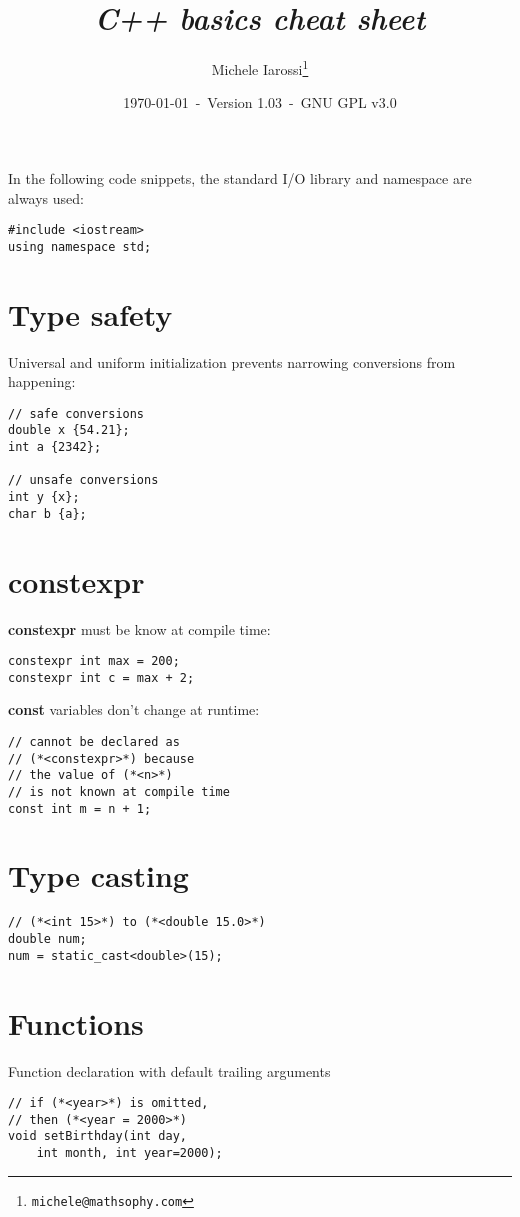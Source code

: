 \documentclass[10pt]{article}
\begin{document}
\title{\emph{C++ basics cheat sheet}}
\author{Michele Iarossi\thanks{\texttt{michele@mathsophy.com}}}
\date{\small \today~-~Version 1.03~-~GNU GPL v3.0}


\maketitle

\begin{multicols*}{3}
In the following code snippets, the standard I/O library and namespace are always used:
\begin{lstlisting}
#include <iostream>
using namespace std;
\end{lstlisting}
%
%
\section*{Type safety}
\small
Universal and uniform initialization prevents narrowing
conversions from happening:
\begin{lstlisting}
// safe conversions
double x {54.21};
int a {2342};

// unsafe conversions
int y {x};
char b {a};
\end{lstlisting}
%
%
\section*{constexpr}
\small
\textbf{constexpr} must be know at compile time:
\begin{lstlisting}
constexpr int max = 200;
constexpr int c = max + 2;
\end{lstlisting}
\textbf{const} variables don't change at runtime:
\begin{lstlisting}
// cannot be declared as 
// (*<constexpr>*) because
// the value of (*<n>*)
// is not known at compile time
const int m = n + 1;
\end{lstlisting}
%
%
\section*{Type casting}
\small
\begin{lstlisting}
// (*<int 15>*) to (*<double 15.0>*)
double num;
num = static_cast<double>(15);
\end{lstlisting}
%
%
\section*{Functions}
\small
Function declaration with
default trailing arguments
\begin{lstlisting}
// if (*<year>*) is omitted, 
// then (*<year = 2000>*)
void setBirthday(int day,
    int month, int year=2000);
\end{lstlisting}
%
%

\end{multicols*}
\end{document}
